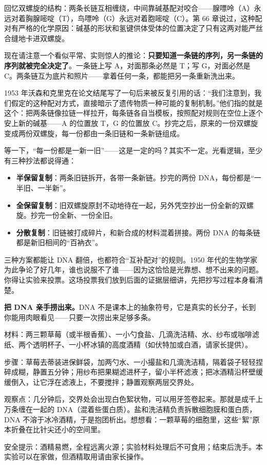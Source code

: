 回忆双螺旋的结构：两条长链互相缠绕，中间靠碱基配对咬合——腺嘌呤（A）永远对着胸腺嘧啶（T），鸟嘌呤（G）永远对着胞嘧啶（C）。第 66 章说过，这种配对有严格的化学原因：碱基的形状和氢键供体受体的位置决定了只有这两对能严丝合缝地卡进双螺旋。

现在请注意一个看似平常、实则惊人的推论：\textbf{只要知道一条链的序列，另一条链的序列就被完全决定了}。一条链上写 A，对面那条必然是 T；写 G，对面必然是 C。两条链互为底片和照片——拿着任何一条，都能把另一条重新洗出来。

1953 年沃森和克里克在论文结尾写了一句后来被反复引用的话：“我们注意到，我们假定的这种配对方式，直接暗示了遗传物质一种可能的复制机制。”他们指的就是这个：把两条链像拉链一样拉开，每条链各自当模板，按照配对规则在空位上逐个安上新的碱基——A 的位置放 T，G 的位置放 C。抄完之后，原来的一份双螺旋变成两份双螺旋，每一份都由一条旧链和一条新链组成。

等一下，“每一份都是一新一旧”——这是一定的吗？其实不一定。光看逻辑，至少有三种抄法都说得通：

\begin{itemize}[itemsep=2pt]
\item \textbf{半保留复制}：两条旧链拆开，各带一条新链。抄完的两份 DNA，每份都是“一半旧、一半新”。
\item \textbf{全保留复制}：旧双螺旋原封不动地待在一起，另外凭空抄出一份全新的双螺旋。抄完一份全新、一份全旧。
\item \textbf{分散复制}：旧链被打成碎片，和新合成的材料混着拼接。两份 DNA 的每条链都是新旧相间的“百衲衣”。
\end{itemize}

三种方案都能让 DNA 翻倍，也都符合“互补配对”的规则。1950 年代的生物学家为此争论了好几年，谁也说服不了谁——因为这恰恰是光靠想、想不出来的问题。你得让实验来投票。这场投票我们放到后面的证据层细讲，先把抄写过程本身看清楚。

\begin{shiyan}
\textbf{把 DNA 亲手捞出来。}DNA 不是课本上的抽象符号，它是真实的长分子，长到你能用肉眼看见——只要一次捞出来足够多条。

材料：两三颗草莓（或半根香蕉）、一小勺食盐、几滴洗洁精、水、纱布或咖啡滤纸、两个透明杯子、一小杯冰镇的高度酒精（如伏特加或白酒，请家长提供）。

步骤：草莓去蒂装进保鲜袋，加两勺水、一小撮盐和几滴洗洁精，隔着袋子轻轻捏碎成糊，静置五分钟；用纱布把果糊滤进杯子，留小半杯滤液；把冰酒精沿杯壁缓缓倒入，让它浮在滤液上，不要搅拌；静置观察两层交界处。

观察点：几分钟后，交界处会出现白色絮状物，可以用牙签卷起来。那就是成千上万条缠在一起的 DNA（混着些蛋白质）。盐和洗洁精负责拆散细胞膜和蛋白质，DNA 不溶于冰冷酒精，于是抱团析出。想想看：一颗草莓的细胞里，这些“絮”原本折叠在比针尖还小的空间里。

安全提示：酒精易燃，全程远离火源；实验材料处理后不可食用；结束后洗手。本实验可以在家做，但酒精取用请由家长操作。
\end{shiyan}

